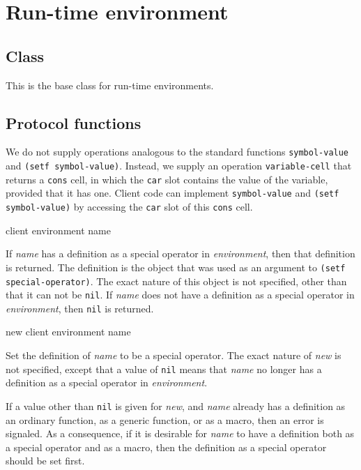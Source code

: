 \chapter{Run-time environment}

\section{Class}


This is the base class for run-time environments.

\section{Protocol functions}
\label{sec-run-time-protocol-functions}

We do not supply operations analogous to the standard functions
\texttt{symbol-value} and \texttt{(setf symbol-value)}.  Instead, we
supply an operation \texttt{variable-cell} that returns a
\texttt{cons} cell, in which the \texttt{car} slot contains the value
of the variable, provided that it has one.  Client code can implement
\texttt{symbol-value} and \texttt{(setf symbol-value)} by accessing
the \texttt{car} slot of this \texttt{cons} cell.

 {client environment name}

If \textit{name} has a definition as a special operator in
\textit{environment}, then that definition is returned.  The
definition is the object that was used as an argument to \texttt{(setf
  special-operator)}.  The exact nature of this object is not
specified, other than that it can not be \texttt{nil}.  If
\textit{name} does not have a definition as a special
operator in \textit{environment}, then \texttt{nil} is returned.

 {new client environment name}

Set the definition of \textit{name} to be a special operator.
The exact nature of \textit{new} is not specified, except that a
value of \texttt{nil} means that \textit{name} no longer has
a definition as a special operator in \textit{environment}.

If a value other than \texttt{nil} is given for \textit{new}, and
\textit{name} already has a definition as an ordinary
function, as a generic function, or as a macro, then an error is
signaled.  As a consequence, if it is desirable for
\textit{name} to have a definition both as a special operator
and as a macro, then the definition as a special operator should be
set first.

